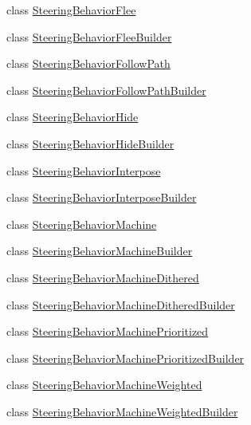 \begin{DoxyCompactItemize}
class \mbox{\hyperlink{classnjli_1_1_world_factory_abe5b6c2976b9a4af7cc42cfdce07f49a}{Steering\+Behavior\+Flee}}
\item 
class \mbox{\hyperlink{classnjli_1_1_world_factory_a1c3bbcf291250eea89b6635de85e1e2e}{Steering\+Behavior\+Flee\+Builder}}
\item 
class \mbox{\hyperlink{classnjli_1_1_world_factory_a18bd9aa0161c5192e06fd1f7e84f9629}{Steering\+Behavior\+Follow\+Path}}
\item 
class \mbox{\hyperlink{classnjli_1_1_world_factory_a325a06eb71c68e6ac19169f195f01e6a}{Steering\+Behavior\+Follow\+Path\+Builder}}
\item 
class \mbox{\hyperlink{classnjli_1_1_world_factory_afea71c0f910d2c882f65eeb22ec21151}{Steering\+Behavior\+Hide}}
\item 
class \mbox{\hyperlink{classnjli_1_1_world_factory_ac9e1b81187f3470e505334b0a1beaef2}{Steering\+Behavior\+Hide\+Builder}}
\item 
class \mbox{\hyperlink{classnjli_1_1_world_factory_a86b9d6c674361a8596e3b0fbb0f1f0d5}{Steering\+Behavior\+Interpose}}
\item 
class \mbox{\hyperlink{classnjli_1_1_world_factory_a073d777b292e30fef8f545cc8a12defe}{Steering\+Behavior\+Interpose\+Builder}}
\item 
class \mbox{\hyperlink{classnjli_1_1_world_factory_a1c0f500fc05cc445717c07bc3f03d675}{Steering\+Behavior\+Machine}}
\item 
class \mbox{\hyperlink{classnjli_1_1_world_factory_aa9eb0844824d2963ab7caeaab5b8b385}{Steering\+Behavior\+Machine\+Builder}}
\item 
class \mbox{\hyperlink{classnjli_1_1_world_factory_a483b5ee717dc5d467348d1a320f4914c}{Steering\+Behavior\+Machine\+Dithered}}
\item 
class \mbox{\hyperlink{classnjli_1_1_world_factory_a43b5786c14f6970b98e4d107557a9b9c}{Steering\+Behavior\+Machine\+Dithered\+Builder}}
\item 
class \mbox{\hyperlink{classnjli_1_1_world_factory_afd17df6bd59c939f0d8de6be28d4ccfe}{Steering\+Behavior\+Machine\+Prioritized}}
\item 
class \mbox{\hyperlink{classnjli_1_1_world_factory_ac177594af60da258dc536355f811ff9e}{Steering\+Behavior\+Machine\+Prioritized\+Builder}}
\item 
class \mbox{\hyperlink{classnjli_1_1_world_factory_aaeb3835c39cd27bb5d7a81e9091ba8f2}{Steering\+Behavior\+Machine\+Weighted}}
\item 
class \mbox{\hyperlink{classnjli_1_1_world_factory_abedd9c47f3cd4fbf1a04bd6c644140e4}{Steering\+Behavior\+Machine\+Weighted\+Builder}}

\end{DoxyCompactItemize}

